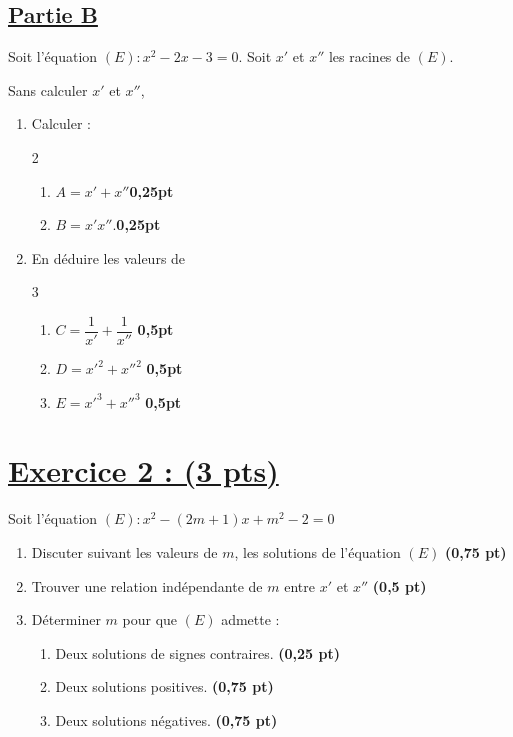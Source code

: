 \documentclass[12pt,a4paper]{article}
\begin{document}
\subsection*{\underline{Partie B}}
Soit l'équation $(E) : x^2 - 2x - 3 = 0$. Soit $x'$ et $x''$ les racines de $(E)$.

    Sans calculer $x'$ et $x''$,
    \begin{enumerate}
        \item Calculer : 
             \begin{multicols}{2}
    \setlength{\columnseprule}{0.1mm} %
        \begin{enumerate}
        \item $A =x' + x''$\hfill \textbf{0,25pt}
        \item $B =x'x''$.\hfill \textbf{0,25pt}
        \end{enumerate}
  \end{multicols}
        \item En déduire les valeurs de 
     \begin{multicols}{3}
    \setlength{\columnseprule}{0.1mm} %
        \begin{enumerate}
        \item $C = \dfrac{1}{x'} + \dfrac{1}{x''}$ \hfill \textbf{0,5pt}
        \item $D = {x'}^2 + {x''}^2$ \hfill \textbf{0,5pt}
        \item $E = {x'}^3 + {x''}^3$ \hfill \textbf{0,5pt}
        \end{enumerate}
     \end{multicols}
    \end{enumerate}

\section*{\underline{Exercice 2 : (3 pts)}}

Soit l'équation $(E) : x^2 - (2m + 1)x + m^2 - 2 = 0$

\begin{enumerate}
    \item Discuter suivant les valeurs de $m$, les solutions de l'équation $(E)$ \hfill \textbf{(0,75 pt)}
    
    \item Trouver une relation indépendante de $m$ entre $x'$ et $x''$ \hfill \textbf{(0,5 pt)}
    
    \item Déterminer $m$ pour que $(E)$ admette :
    \begin{enumerate}
        \item Deux solutions de signes contraires. \hfill \textbf{(0,25 pt)}
        \item Deux solutions positives. \hfill \textbf{(0,75 pt)}
        \item Deux solutions négatives. \hfill \textbf{(0,75 pt)}
    \end{enumerate}
\end{enumerate}
\newpage
\end{document}
